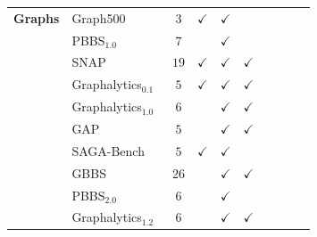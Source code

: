 \begin{landscape}
\begin{table}[htbp]
{\begin{tabular}{ll|cccccccc}
                    \hline                                                                                          %
                { \textbf{Graphs}}  & { Graph500~\cite{Murphy2010}              }      &    $3$       & $\checkmark$  & $\checkmark$  &               &                &               &              &               \\
                { ~              }  & { PBBS$_{1.0}$~\cite{Shun2012}            }      &    $7$       &               & $\checkmark$  &               &                &               &              &               \\
                { ~              }  & { SNAP~\cite{Leskovec2016}                }      &    $19$       & $\checkmark$  & $\checkmark$  & $\checkmark$  &                &               &              &               \\
                { ~              }  & { Graphalytics$_{0.1}$~\cite{Capota2015}  }      &    $5$       & $\checkmark$  & $\checkmark$  & $\checkmark$  &                &               &              &               \\
                { ~              }  & { Graphalytics$_{1.0}$~\cite{Iosup2016}   }      &    $6$       &               & $\checkmark$  & $\checkmark$  &                &               &              &               \\
                { ~              }  & { GAP~\cite{Beamer2017}                   }      &    $5$       &               & $\checkmark$  & $\checkmark$  &                &               &              &               \\
                { ~              }  & { SAGA-Bench~\cite{Basak2020}             }      &    $5$       & $\checkmark$  & $\checkmark$  &               &                &               &              &               \\
                { ~              }  & { GBBS~\cite{Dhulipala2020,Dhulipala2021} }      &    $26$       &               & $\checkmark$  & $\checkmark$  &                &               &              &               \\
                { ~              }  & { PBBS$_{2.0}$~\cite{Anderson2022}        }      &    $6$       &               & $\checkmark$  &               &                &               &              &               \\
                { ~              }  & { Graphalytics$_{1.2}$~\cite{Iosup2023}   }      &    $6$       &               & $\checkmark$  & $\checkmark$  &                &               &              &               \\

\end{tabular}}
\end{table}
\end{landscape}
